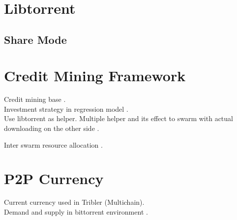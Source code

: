 \section{Libtorrent}
\subsection{Share Mode}

\section{Credit Mining Framework}
Credit mining base \cite{2015:creditmining:capota}.\\ Investment strategy in regression model \cite{2013:investmentcm:capota}. \\Use libtorrent as helper. Multiple helper and its effect to swarm with actual downloading on the other side \cite{2014:bwmarket:capota}.

Inter swarm resource allocation \cite{2011:interswarm:mihai}.

\section{P2P Currency}
Current currency used in Tribler (Multichain)\cite{2015:multichain:norberhuis}.\\ Demand and supply in bittorrent environment \cite{2009:demandsupplyres:andrade}.